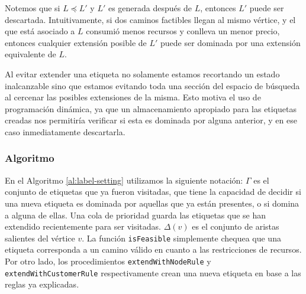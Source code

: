 Notemos que si $L \preceq L'$ y $L'$ es generada después de $L$, entonces $L'$ puede ser descartada. Intuitivamente, si dos caminos factibles llegan al mismo vértice, y el que está asociado a $L$ consumió menos recursos y conlleva un menor precio, entonces cualquier extensión posible de $L'$ puede ser dominada por una extensión equivalente de $L$. 

Al evitar extender una etiqueta no solamente estamos recortando un estado inalcanzable sino que estamos evitando toda una sección del espacio de búsqueda al cercenar las posibles extensiones de la misma. Esto motiva el uso de programación dinámica, ya que un almacenamiento apropiado para las etiquetas creadas nos permitiría verificar si esta es dominada por alguna anterior, y en ese caso inmediatamente descartarla.    

\subsubsection{Algoritmo}

En el Algoritmo \ref{al:label-setting} utilizamos la siguiente notación: $\Gamma$ es el conjunto de etiquetas que ya fueron visitadas, que tiene la capacidad de decidir si una nueva etiqueta es dominada por aquellas que ya están presentes, o si domina a alguna de ellas. Una cola de prioridad guarda las etiquetas que se han extendido recientemente para ser visitadas. $\Delta(v)$ es el conjunto de aristas salientes del vértice $v$. La función \texttt{isFeasible} simplemente chequea que una etiqueta corresponda a un camino válido en cuanto a las restricciones de recursos. Por otro lado, los procedimientos \texttt{extendWithNodeRule} y \texttt{extendWithCustomerRule} respectivamente crean una nueva etiqueta en base a las reglas ya explicadas.

